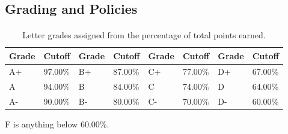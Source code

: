 \documentclass[
    10pt,
    dvipsnames,
    svgnames,
    x11names,
    aspectratio=1610,
    english,
    codeminted]{beamer}
\begin{document}
\subsection*{Grading and Policies}
\begingroup
\divframetrue
\renewcommand{\divbartextA}{\secname}
\renewcommand{\divbartextB}{}
\begin{frame}{\secname}
  \divbar{\secname}{\subsecname}
  \framesubtitle{\subsecname}
  
\begin{table}[h]
\caption{Letter grades assigned from the percentage of total points earned.}
\footnotesize\centering
\renewcommand{\arraystretch}{1.2}
\begin{tabular}{m{0.9cm}m{1.3cm}m{0.9cm}m{1.3cm}m{0.9cm}m{1.3cm}m{0.9cm}m{1.3cm}}
  \toprule
  \textbf{Grade} & \textbf{Cutoff} & \textbf{Grade} & \textbf{Cutoff} & \textbf{Grade} & \textbf{Cutoff} & \textbf{Grade} & \textbf{Cutoff} \\
  \midrule
  A+ & 97.00\% & B+ & 87.00\% & C+ & 77.00\% & D+ & 67.00\% \\
  A  & 94.00\% & B  & 84.00\% & C  & 74.00\% & D  & 64.00\% \\
  A- & 90.00\% & B- & 80.00\% & C- & 70.00\% & D- & 60.00\% \\
  \bottomrule
\end{tabular}
\end{table}
F is anything below 60.00\%.


\end{frame}
\end{document}

